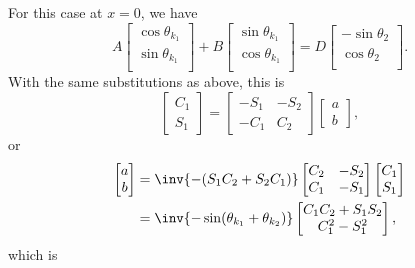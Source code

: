 \begin{enumerate}[(i)]
For this case at \( x = 0 \), we have
%
\begin{equation}\label{eqn:gradQuantumProblemSet4Problem3:940}
A
\begin{bmatrix}
\cos\theta_{k_1} \\
\sin\theta_{k_1} \\
\end{bmatrix}
+
B
\begin{bmatrix}
\sin\theta_{k_1} \\
\cos\theta_{k_1} \\
\end{bmatrix}
=
D
\begin{bmatrix}
-\sin \theta_2 \\
\cos \theta_2 \\
\end{bmatrix}.
\end{equation}
%
With the same substitutions as above, this is
%
\begin{equation}\label{eqn:gradQuantumProblemSet4Problem3:860}
\begin{bmatrix}
C_1 \\
S_1
\end{bmatrix}
=
\begin{bmatrix}
- S_1 & -S_2 \\
- C_1 & C_2
\end{bmatrix}
\begin{bmatrix}
a \\
b
\end{bmatrix},
\end{equation}
%
or
\begin{equation}\label{eqn:gradQuantumProblemSet4Problem3:880}
\begin{aligned}
\begin{bmatrix}
a \\
b
\end{bmatrix}
&=
\inv{- (S_1 C_2 + S_2 C_1) }
\begin{bmatrix}
C_2 & -S_2 \\
C_1 & -S_1
\end{bmatrix}
\begin{bmatrix}
C_1 \\
S_1
\end{bmatrix}
\\ &=
\inv{-\sin(\theta_{k_1} + \theta_{k_2})}
\begin{bmatrix}
C_1 C_2 + S_1 S_2 \\
C_1^2 - S_1^2
\end{bmatrix},
\end{aligned}
\end{equation}
%
which is


\end{enumerate}
